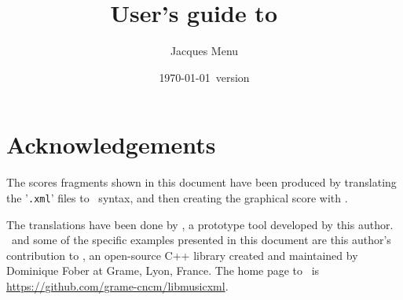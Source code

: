 \documentclass[12pt,a4paper]{article}
\begin{document}


\title{
User's guide to \xmlToly\ \\[5pt]
}

\newsavebox{\authorBox}

\author{
Jacques Menu 
}

\date {\normalsize \today\ version}

\maketitle


\section{Acknowledgements}

The scores fragments shown in this document have been produced by translating the '{\tt .xml}' files to \lily\ syntax, and then creating the graphical score with \lily. 

The translations have been done by \xmlToly, a prototype tool developed by this author. \xmlToly\ and some of the specific examples presented in this document are this author's contribution to \lib, an open-source C++ library created and maintained by Dominique Fober at Grame, Lyon, France. The home page to \lib\ is \url{https://github.com/grame-cncm/libmusicxml}.
\end{document}
